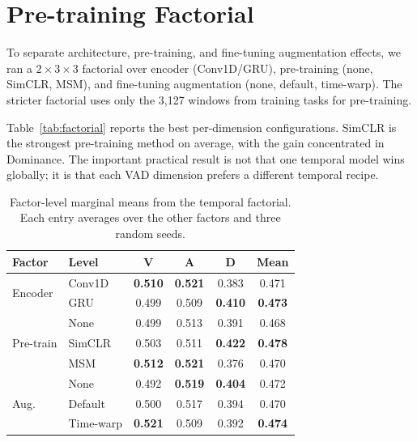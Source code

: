 \documentclass[sigconf,review,anonymous]{acmart}
\newcommand{\best}[1]{\textbf{\textcolor{bestcol}{#1}}}
\begin{document}
\section{Pre-training Factorial}
\label{sec:factorial}

To separate architecture, pre-training, and fine-tuning augmentation effects,
we ran a $2\times3\times3$ factorial over encoder (Conv1D/GRU), pre-training
(none, SimCLR, MSM), and fine-tuning augmentation (none, default, time-warp).
The stricter factorial uses only the 3,127 windows from training tasks for
pre-training.

Table~\ref{tab:factorial} reports the best per-dimension configurations.
SimCLR is the strongest pre-training method on average, with the gain
concentrated in Dominance.
The important practical result is not that one temporal model wins globally;
it is that each VAD dimension prefers a different temporal recipe.

\begin{table}[t]
\caption{Factor-level marginal means from the temporal factorial. Each entry
averages over the other factors and three random seeds.}
\label{tab:factor_marginals}
\centering
\setlength{\tabcolsep}{4pt}
\small
\begin{tabular}{llcccc}
\toprule
\textbf{Factor} & \textbf{Level} & \textbf{V} & \textbf{A} & \textbf{D} & \textbf{Mean} \\
\midrule
\multirow{2}{*}{Encoder}
  & Conv1D & \best{0.510} & \best{0.521} & 0.383 & 0.471 \\
  & GRU    & 0.499 & 0.509 & \best{0.410} & \best{0.473} \\
\midrule
\multirow{3}{*}{Pre-train}
  & None   & 0.499 & 0.513 & 0.391 & 0.468 \\
  & SimCLR & 0.503 & 0.511 & \best{0.422} & \best{0.478} \\
  & MSM    & \best{0.512} & \best{0.521} & 0.376 & 0.470 \\
\midrule
\multirow{3}{*}{Aug.}
  & None    & 0.492 & \best{0.519} & \best{0.404} & 0.472 \\
  & Default & 0.500 & 0.517 & 0.394 & 0.470 \\
  & Time-warp & \best{0.521} & 0.509 & 0.392 & \best{0.474} \\
\bottomrule
\end{tabular}
\end{table}
\end{document}
